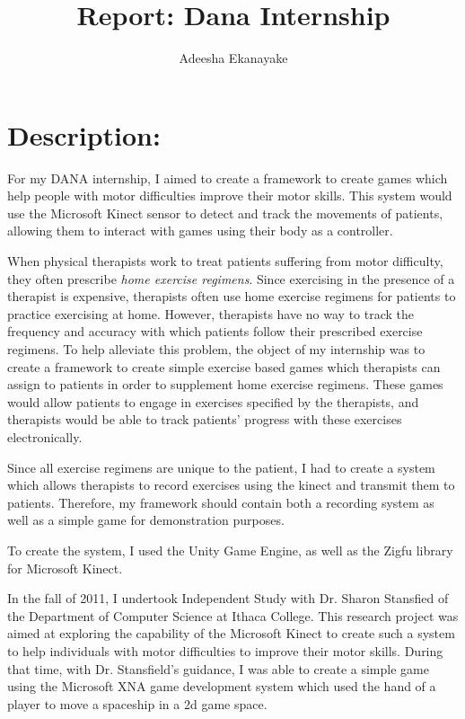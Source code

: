\documentclass{report}
\author{Adeesha Ekanayake}
\title{Report: Dana Internship}
\begin{document}
\maketitle

\section{Description: }
For my DANA internship, I aimed to create a framework to create games which help people with motor difficulties improve their motor skills. This system would use the Microsoft Kinect sensor to detect and track the movements of patients, allowing them to interact with games using their body as a controller. 

When physical therapists work to treat patients suffering from motor difficulty, they often prescribe \textit{home exercise regimens}. Since exercising in the presence of a therapist is expensive, therapists often use home exercise regimens for patients to practice exercising at home. However, therapists have no way to track the frequency and accuracy with which patients follow their prescribed exercise regimens. To help alleviate this problem, the object of my internship was to create a framework to create simple exercise based games which therapists can assign to patients in order to supplement home exercise regimens. These games would allow patients to engage in exercises specified by the therapists, and therapists would be able to track patients' progress with these exercises electronically.

Since all exercise regimens are unique to the patient, I had to create a system which allows therapists to record exercises using the kinect and transmit them to patients. Therefore, my framework should contain both a recording system as well as a simple game for demonstration purposes.

To create the system, I used the Unity Game Engine, as well as the Zigfu library for Microsoft Kinect. 

In the fall of 2011, I undertook Independent Study with Dr. Sharon Stansfied of the Department of Computer Science at Ithaca College. This research project was aimed at exploring the capability of the Microsoft Kinect to create such a system to help individuals with motor difficulties to improve their motor skills. During that time, with Dr. Stansfield's guidance, I was able to create a simple game using the Microsoft XNA game development system which used the hand of a player to move a spaceship in a 2d game space. 
\end{document}
